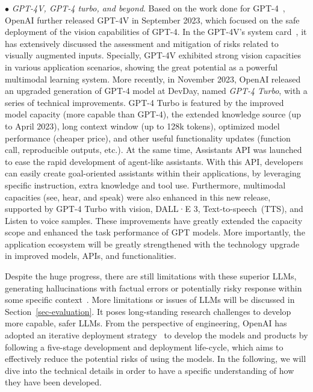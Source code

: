 {
$\bullet$ \emph{GPT-4V, GPT-4 turbo, and beyond}. Based on the work done for GPT-4~\cite{OpenAI-OpenAI-2023-GPT-4}, OpenAI further released GPT-4V in September 2023, 
which focused on the safe deployment of the vision capabilities of GPT-4. In the GPT-4V's  system card~\cite{OpenAI-OpenAI-2023-GPT-4v}, it has extensively discussed the  assessment and mitigation of risks related to visually augmented inputs.
Specially, GPT-4V  exhibited strong vision capacities in various application scenarios, showing the great potential as a powerful multimodal learning  system. 
More recently, in November 2023, OpenAI 
 released an upgraded generation of GPT-4 model at DevDay, named \emph{GPT-4 Turbo}, with a series of  technical improvements. 
 GPT-4 Turbo is featured by the improved model capacity (more capable than GPT-4), the extended knowledge source (up to April 2023), long context window (up to 128k tokens), optimized model performance (cheaper price), and other useful functionality updates (function call, reproducible outputs, etc.). 
 At the same time,  Assistants API was  launched to ease the rapid development of  agent-like assistants. With this API, developers can easily create goal-oriented assistants within their applications, by leveraging specific instruction,  extra knowledge and tool use. Furthermore, multimodal capacities (see, hear, and speak) were also enhanced in this new release, supported by  GPT-4 Turbo with vision, DALL·E 3, Text-to-speech~(TTS), and Listen to voice samples. 
 These improvements  have greatly extended the capacity scope and enhanced the task  performance of GPT models. %
 More importantly, the application ecosystem will be greatly strengthened with the technology upgrade in improved models, APIs, and functionalities.  
 }
 





Despite the huge progress, there are still limitations with these superior LLMs, \eg generating hallucinations with factual errors or potentially risky response within some specific context~\cite{OpenAI-OpenAI-2023-GPT-4}. More limitations or issues of LLMs will be discussed in Section~\ref{sec-evaluation}. 
It poses  long-standing research challenges to develop more capable, safer LLMs. 
From the perspective of engineering, OpenAI has adopted an iterative deployment strategy~\cite{OpenAI-blog-2022-lessons}  to develop the models and products by following a five-stage development and deployment life-cycle, which aims to effectively reduce the potential risks of using the models. 
In the following, we will dive into the technical details in order to have a specific understanding of how they have been  developed. 




